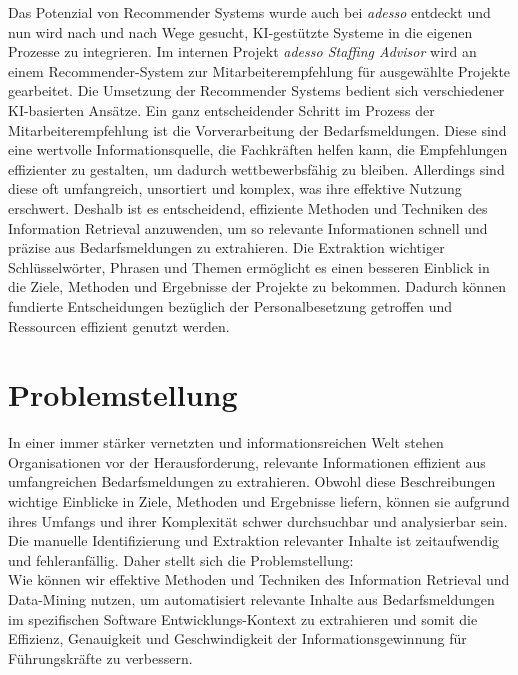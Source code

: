 \documentclass[a4paper,12pt]{scrreprt}
\newcommand{\hiddenchapter}[1]{
	\chapter*{{#1}}
}
\begin{document}
Das Potenzial von Recommender Systems wurde auch bei \emph{adesso} entdeckt und nun wird nach und nach Wege gesucht, KI-gestützte Systeme in die eigenen Prozesse zu integrieren. Im internen Projekt \emph{adesso Staffing Advisor} wird an einem Recommender-System zur Mitarbeiterempfehlung für ausgewählte Projekte gearbeitet. Die Umsetzung der Recommender Systems bedient sich verschiedener KI-basierten Ansätze. Ein ganz entscheidender Schritt im Prozess der Mitarbeiterempfehlung ist die Vorverarbeitung der Bedarfsmeldungen. Diese sind eine wertvolle Informationsquelle, die Fachkräften helfen kann, die Empfehlungen effizienter zu gestalten, um dadurch wettbewerbsfähig zu bleiben. Allerdings sind diese oft umfangreich, unsortiert und komplex, was ihre effektive Nutzung erschwert. Deshalb ist es entscheidend, effiziente Methoden und Techniken des Information Retrieval anzuwenden, um so relevante Informationen schnell und präzise aus Bedarfsmeldungen zu extrahieren. Die Extraktion wichtiger Schlüsselwörter, Phrasen und Themen ermöglicht es einen besseren Einblick in die Ziele, Methoden und Ergebnisse der Projekte zu bekommen. Dadurch können fundierte Entscheidungen bezüglich der Personalbesetzung getroffen und Ressourcen effizient genutzt werden.\\
\hiddenchapter{Problemstellung}
In einer immer stärker vernetzten und informationsreichen Welt stehen Organisationen vor der Herausforderung, relevante Informationen effizient aus umfangreichen Bedarfsmeldungen zu extrahieren. Obwohl diese Beschreibungen wichtige Einblicke in Ziele, Methoden und Ergebnisse liefern, können sie aufgrund ihres Umfangs und ihrer Komplexität schwer durchsuchbar und analysierbar sein. Die manuelle Identifizierung und Extraktion relevanter Inhalte ist zeitaufwendig und fehleranfällig. Daher stellt sich die Problemstellung: \\

Wie können wir effektive Methoden und Techniken des Information Retrieval und Data-Mining nutzen, um automatisiert relevante Inhalte aus Bedarfsmeldungen im spezifischen Software Entwicklungs-Kontext zu extrahieren und somit die Effizienz, Genauigkeit und Geschwindigkeit der Informationsgewinnung für Führungskräfte zu verbessern.\\
\end{document}
